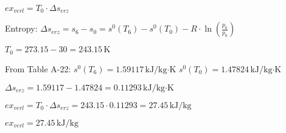 \( ex_{verl} = T_0 \cdot \Delta s_{erz} \)  

Entropy:  
\( \Delta s_{erz} = s_6 - s_0 = s^0(T_6) - s^0(T_0) - R \cdot \ln\left(\frac{p_6}{p_0}\right) \)  

\( T_0 = 273.15 - 30 = 243.15 \, \text{K} \)  

From Table A-22:  
\( s^0(T_6) = 1.59117 \, \text{kJ/kg·K} \)  
\( s^0(T_0) = 1.47824 \, \text{kJ/kg·K} \)  

\( \Delta s_{erz} = 1.59117 - 1.47824 = 0.11293 \, \text{kJ/kg·K} \)  

\( ex_{verl} = T_0 \cdot \Delta s_{erz} = 243.15 \cdot 0.11293 = 27.45 \, \text{kJ/kg} \)  

\( ex_{verl} = 27.45 \, \text{kJ/kg} \)